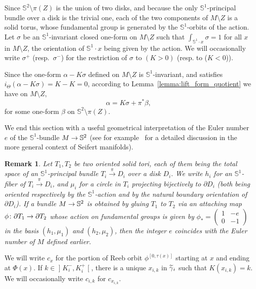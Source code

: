 \documentclass[10pt,a4paper]{amsart}
\newcommand{\bbS}{\mathbb{S}}
\renewcommand*{\to}{\mathchoice{\longrightarrow}{\rightarrow}{\rightarrow}{\rightarrow}}
\let\oldtilde\tilde
\renewcommand*{\tilde}[1]{\mathchoice{\widetilde{#1}}{\widetilde{#1}}{\oldtilde{#1}}{\oldtilde{#1}}}
\newtheorem{rema}[theo]{Remark}
\theoremstyle{definition}\newtheorem{defi}[theo]{Definition}
\begin{document}
Since $\bbS^2 \setminus \pi(Z)$ is the union of two disks, and because the only $\bbS^1$-principal bundle over a disk is the trivial one, each of the two components of $M \setminus Z$ is a solid torus, whose fundamental group is generated by the $\bbS^1$-orbits of the action. Let $\sigma$ be an $\bbS^1$-invariant closed one-form on $M \setminus Z$ such that $\int_{\bbS^1\cdot x} \sigma = 1$ for all $x$ in $M \setminus Z$, the orientation of $\bbS^1 \cdot x$ being given by the action. We will occasionally write $\sigma ^+$ (resp.~$\sigma^-$) for the restriction of $\sigma$ to $(K>0)$ (resp. to ($K < 0$)).

Since the one-form $\alpha - K \sigma$ defined on $M \setminus Z$ is $\bbS^1$-invariant, and satisfies\linebreak $i_\Theta(\alpha - K \sigma) = K - K = 0$, according to Lemma~\ref{lemma:lift_form_quotient} we have on $M \setminus Z$,
\[
\alpha = K \sigma + \pi^*\beta,
\]
for some one-form $\beta$ on $\bbS^2 \setminus \pi(Z)$.

We end this section with a useful geometrical interpretation of the Euler number~$e$ of the $\bbS^1$-bundle $M \to \bbS^2$ (see for example~\cite{jankins1983lectures} for a detailed discussion in the more general context of Seifert manifolds).

\begin{rema}\label{remark:euler_number}
Let $T_1, T_2$ be two oriented solid tori, each of them being the total space of an $\bbS^1$-principal bundle $T_i \xrightarrow{\pi} D_i$ over a disk $D_i$. We write $h_i$ for an $\bbS^1$-fiber of $T_i \xrightarrow{\pi} D_i$, and $\mu_i$ for a circle in $T_i$ projecting bijectively to $\partial D_i$ (both being oriented respectively by the $\bbS^1$-action and by the natural boundary orientation of $\partial D_i$). If a bundle $M \to \bbS^2$ is obtained by gluing $T_1$ to $T_2$ via an attaching map $\phi \colon \partial T_1 \to \partial T_2$ whose action on fundamental groups is given by $\phi_* =
\left(\begin{smallmatrix}
1 & -e\\0 & -1
\end{smallmatrix}\right)$ in the basis $(h_1, \mu_1)$ and $(h_2, \mu_2)$, then the integer $e$ coincides with the Euler number of $M$ defined earlier.
\end{rema}

We will write $c_x$ for the portion of Reeb orbit $\phi^{[0,\tau(x)]}$ starting at $x$ and ending at $\Phi(x)$. If $k \in\mathopen{]}K^-_i, K^+_i\mathclose{[}$, there is a unique $x_{i,k}$ in $\tilde \gamma_i$ such that $K(x_{i,k}) = k$. We will occasionally write $c_{i,k}$ for $c_{x_{i,k}}$.
\end{document}
